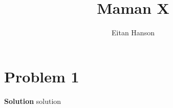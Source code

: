 \documentclass[11pt]{article}
\title{Maman X}
\author{Eitan Hanson}
\date{}
\newcommand{\problem}[1]{\section*{Problem #1}}
\newcommand{\solution}{\textbf{\large Solution}}
\begin{document}
\maketitle

\problem{1}
\solution
solution
\end{document}
